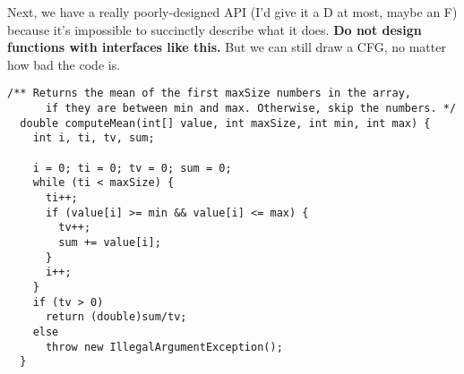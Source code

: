 \documentclass[11pt]{article}
\begin{document}
Next, we have a really poorly-designed API (I'd give it a D at most,
maybe an F) because it's impossible to succinctly describe what it
does. {\bf Do not design functions with interfaces like this.} But we
can still draw a CFG, no matter how bad the code is.
\begin{lstlisting}[basicstyle=\scriptsize\ttfamily]
  /** Returns the mean of the first maxSize numbers in the array,
      if they are between min and max. Otherwise, skip the numbers. */
  double computeMean(int[] value, int maxSize, int min, int max) {
    int i, ti, tv, sum;

    i = 0; ti = 0; tv = 0; sum = 0;
    while (ti < maxSize) {
      ti++;
      if (value[i] >= min && value[i] <= max) {
        tv++;
        sum += value[i];
      }
      i++;
    }
    if (tv > 0)
      return (double)sum/tv;
    else
      throw new IllegalArgumentException();
  }
\end{lstlisting}
\end{document}
